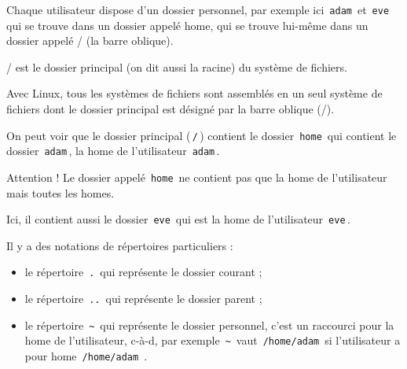 \documentclass[11pt,a4paper]{article}
\begin{document}
            \par
        
			    Chaque utilisateur dispose d'un dossier personnel, par exemple ici \,\verb|adam|\, et \,\verb|eve|\,
			    qui se trouve dans un dossier appel\'e home, qui se trouve lui-m\^eme dans un dossier appel\'e / (la barre oblique). 
        
            \par
        
			    / est le dossier principal (on dit aussi la racine) du syst\`eme de fichiers.
        
            \par
        
			    Avec Linux, tous les syst\`emes de fichiers sont assembl\'es en un seul syst\`eme de fichiers dont le dossier principal est d\'esign\'e par la barre oblique (/).
        
            \par
        
          On peut voir que le dossier principal (\,\verb|/|\,) contient le dossier \,\verb|home|\, 
          qui contient le dossier \,\verb|adam|\,, 
          la home de l'utilisateur \,\verb|adam|\,.
        
            \par
        
          Attention ! Le dossier appel\'e \,\verb|home|\, ne contient pas que la home de l'utilisateur mais toutes les homes.
        
            \par
        
          Ici, il contient aussi le dossier \,\verb|eve|\, qui est la home de l'utilisateur \,\verb|eve|\,.
        
            \par
        
          Il y a des notations de r\'epertoires particuliers :
          
					\begin{itemize}
				
			\item le r\'epertoire \,\verb|.|\, qui repr\'esente le dossier courant ;
			\item le r\'epertoire \,\verb|..|\, qui repr\'esente le dossier parent ;
			\item le r\'epertoire \,\verb|~|\, qui repr\'esente le dossier personnel, 
			        c'est un raccourci pour la home de l'utilisateur, c-\`a-d, par exemple \,\verb|~|\, vaut \,\verb|/home/adam|\, 
			        si l'utilisateur a pour home \,\verb|/home/adam|\, .
					\end{itemize}
				
\end{document}
